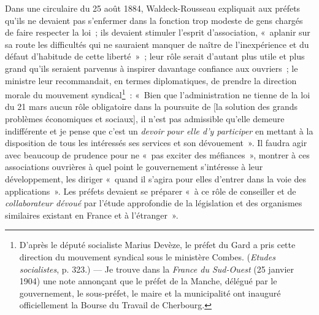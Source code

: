 \documentclass[french,twoside]{book} %
\begin{document}
Dans une circulaire du 25 août 1884, Waldeck-Rousseau expliquait aux préfets qu’ils ne devaient pas s’enfermer dans la fonction trop modeste de gens chargés de faire respecter la loi ; ils devaient stimuler l’esprit d’association, « aplanir sur sa route les difficultés qui ne sauraient manquer de naître de l’inexpérience et du défaut d’habitude de cette liberté » ; leur rôle serait d’autant plus utile et plus grand qu’ils seraient parvenus à inspirer davantage confiance aux ouvriers ; le ministre leur recommandait, en termes diplomatiques, de prendre la direction morale du mouvement syndical\footnote{ \noindent D’après le député socialiste Marius Devèze, le préfet du Gard a pris cette direction du mouvement syndical sous le ministère Combes. (\emph{Etudes socialistes}, p. 323.) — Je trouve dans la \emph{France du Sud-Ouest} (25 janvier 1904) une note annonçant que le préfet de la Manche, délégué par le gouvernement, le sous-préfet, le maire et la municipalité ont inauguré officiellement la Bourse du Travail de Cherbourg.
 } : « Bien  que l’administration ne tienne de la loi du 21 mars aucun rôle obligatoire dans la poursuite de [la solution des grands problèmes économiques et sociaux], il n’est pas admissible qu’elle demeure indifférente et je pense que c’est un \emph{devoir pour elle d’y participer} en mettant à la disposition de tous les intéressés ses services et son dévouement ». Il faudra agir avec beaucoup de prudence pour ne « pas exciter des méfiances », montrer à ces associations ouvrières à quel point le gouvernement s’intéresse à leur développement, les diriger « quand il s’agira pour elles d’entrer dans la voie des applications ». Les préfets devaient se préparer « à ce rôle de conseiller et de \emph{collaborateur dévoué} par l’étude approfondie de la législation et des organismes similaires existant en France et à l’étranger ».\par
\end{document}
